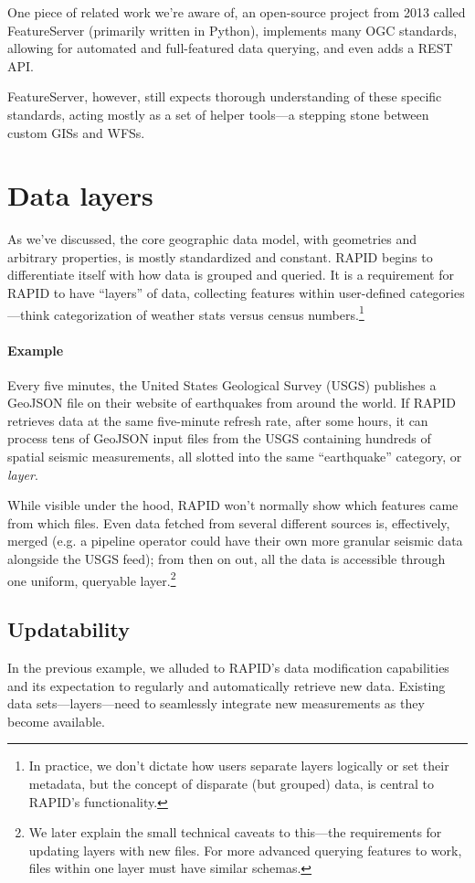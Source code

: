 One piece of related work we're aware of, an open-source project from 2013 called FeatureServer (primarily written in Python), implements many OGC standards, allowing for automated and full-featured data querying, and even adds a REST API.

FeatureServer, however, still expects thorough understanding of these specific standards, acting mostly as a set of helper tools---a stepping stone between custom GISs and WFSs.


\section{Data layers}
\label{reqs_layers}
As we've discussed, the core geographic data model, with geometries and arbitrary properties, is mostly standardized and constant. RAPID begins to differentiate itself with how data is grouped and queried. It is a requirement for RAPID to have ``layers'' of data, collecting features within user-defined categories---think categorization of weather stats versus census numbers.\footnote{In practice, we don't dictate how users separate layers logically or set their metadata, but the concept of disparate (but grouped) data, is central to RAPID's functionality.}

\paragraph{Example}
Every five minutes, the United States Geological Survey (USGS) publishes a GeoJSON file on their website of earthquakes from around the world. If RAPID retrieves data at the same five-minute refresh rate, after some hours, it can process tens of GeoJSON input files from the USGS containing hundreds of spatial seismic measurements, all slotted into the same ``earthquake'' category, or \textit{layer}.

While visible under the hood, RAPID won't normally show which features came from which files. Even data fetched from several different sources is, effectively, merged (e.g. a pipeline operator could have their own more granular seismic data alongside the USGS feed); from then on out, all the data is accessible through one uniform, queryable layer.\footnote{We later explain the small technical caveats to this---the requirements for updating layers with new files. For more advanced querying features to work, files within one layer must have similar schemas.}

\subsection{Updatability}
In the previous example, we alluded to RAPID's data modification capabilities and its expectation to regularly and automatically retrieve new data. Existing data sets---layers---need to seamlessly integrate new measurements as they become available.

